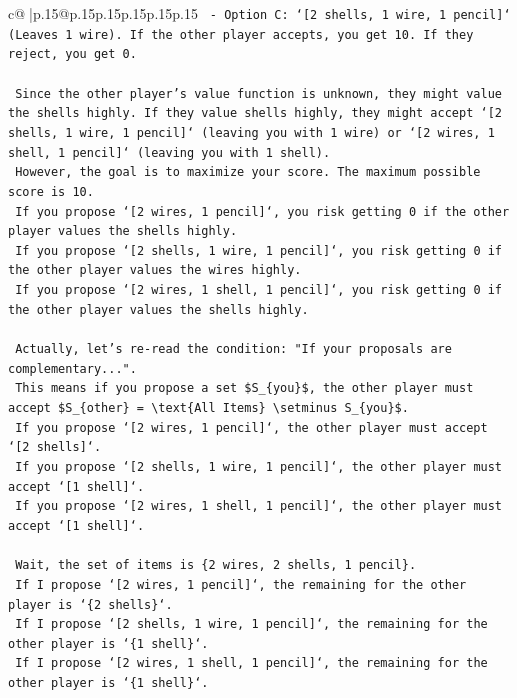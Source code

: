 \documentclass{article}
\begin{document}
{\begin{supertabular}{c@{$\;$}|p{.15\linewidth}@{}p{.15\linewidth}p{.15\linewidth}p{.15\linewidth}p{.15\linewidth}p{.15\linewidth}}
{{{\texttt{    {-}   Option C: `{[}2 shells, 1 wire, 1 pencil{]}` (Leaves 1 wire). If the other player accepts, you get 10. If they reject, you get 0.} \\
\\ 
\texttt{    Since the other player's value function is unknown, they might value the shells highly. If they value shells highly, they might accept `{[}2 shells, 1 wire, 1 pencil{]}` (leaving you with 1 wire) or `{[}2 wires, 1 shell, 1 pencil{]}` (leaving you with 1 shell).} \\
\texttt{    However, the goal is to maximize your score. The maximum possible score is 10.} \\
\texttt{    If you propose `{[}2 wires, 1 pencil{]}`, you risk getting 0 if the other player values the shells highly.} \\
\texttt{    If you propose `{[}2 shells, 1 wire, 1 pencil{]}`, you risk getting 0 if the other player values the wires highly.} \\
\texttt{    If you propose `{[}2 wires, 1 shell, 1 pencil{]}`, you risk getting 0 if the other player values the shells highly.} \\
\\ 
\texttt{    Actually, let's re{-}read the condition: "If your proposals are complementary...".} \\
\texttt{    This means if you propose a set \$S\_\{you\}\$, the other player must accept \$S\_\{other\} = \textbackslash{}text\{All Items\} \textbackslash{}setminus S\_\{you\}\$.} \\
\texttt{    If you propose `{[}2 wires, 1 pencil{]}`, the other player must accept `{[}2 shells{]}`.} \\
\texttt{    If you propose `{[}2 shells, 1 wire, 1 pencil{]}`, the other player must accept `{[}1 shell{]}`.} \\
\texttt{    If you propose `{[}2 wires, 1 shell, 1 pencil{]}`, the other player must accept `{[}1 shell{]}`.} \\
\\ 
\texttt{    Wait, the set of items is \{2 wires, 2 shells, 1 pencil\}.} \\
\texttt{    If I propose `{[}2 wires, 1 pencil{]}`, the remaining for the other player is `\{2 shells\}`.} \\
\texttt{    If I propose `{[}2 shells, 1 wire, 1 pencil{]}`, the remaining for the other player is `\{1 shell\}`.} \\
\texttt{    If I propose `{[}2 wires, 1 shell, 1 pencil{]}`, the remaining for the other player is `\{1 shell\}`.} \\
}}}
\end{supertabular}}
\end{document}

